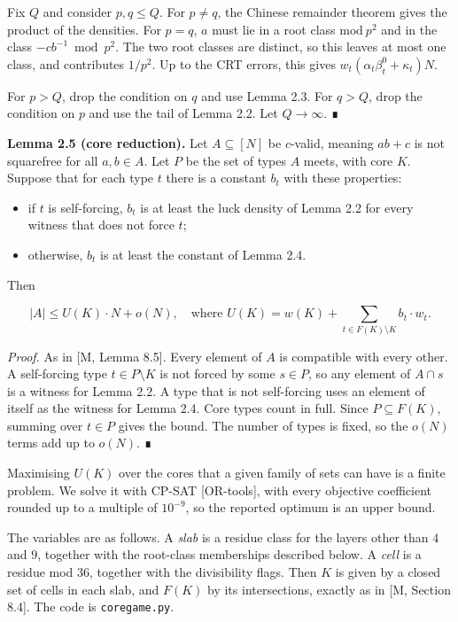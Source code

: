 \documentclass[
  11pt,
]{article}
\providecommand{\tightlist}{%
  \setlength{\itemsep}{0pt}\setlength{\parskip}{0pt}}
\begin{document}
Fix \(Q\) and consider \(p, q \le Q\). For \(p \ne q\), the Chinese
remainder theorem gives the product of the densities. For \(p = q\),
\(a\) must lie in a root class \(\mathrm{mod}\ p^2\) and in the class
\(-cb^{-1} \bmod p^2\). The two root classes are distinct, so this
leaves at most one class, and contributes \(1/p^2\). Up to the CRT
errors, this gives \(w_t(\alpha_t \beta^0_t + \kappa_t)N\).

For \(p > Q\), drop the condition on \(q\) and use Lemma 2.3. For
\(q > Q\), drop the condition on \(p\) and use the tail of Lemma 2.2.
Let \(Q \to \infty\). ∎

\textbf{Lemma 2.5 (core reduction).} Let \(A \subseteq [N]\) be
\(c\)-valid, meaning \(ab + c\) is not squarefree for all
\(a, b \in A\). Let \(P\) be the set of types \(A\) meets, with core
\(K\). Suppose that for each type \(t\) there is a constant \(b_t\) with
these properties:

\begin{itemize}
\tightlist
\item
  if \(t\) is self-forcing, \(b_t\) is at least the luck density of
  Lemma 2.2 for every witness that does not force \(t\);
\item
  otherwise, \(b_t\) is at least the constant of Lemma 2.4.
\end{itemize}

Then

\[|A| \le U(K)\cdot N + o(N), \quad \text{where } U(K) = w(K) + \sum_{t \in F(K) \setminus K} b_t\cdot w_t.\]

\emph{Proof.} As in {[}M, Lemma 8.5{]}. Every element of \(A\) is
compatible with every other. A self-forcing type \(t \in P \setminus K\)
is not forced by some \(s \in P\), so any element of \(A \cap s\) is a
witness for Lemma 2.2. A type that is not self-forcing uses an element
of itself as the witness for Lemma 2.4. Core types count in full. Since
\(P \subseteq F(K)\), summing over \(t \in P\) gives the bound. The
number of types is fixed, so the \(o(N)\) terms add up to \(o(N)\). ∎

Maximising \(U(K)\) over the cores that a given family of sets can have
is a finite problem. We solve it with CP-SAT {[}OR-tools{]}, with every
objective coefficient rounded up to a multiple of \(10^{-9}\), so the
reported optimum is an upper bound.

The variables are as follows. A \emph{slab} is a residue class for the
layers other than \(4\) and \(9\), together with the root-class
memberships described below. A \emph{cell} is a residue mod 36, together
with the divisibility flags. Then \(K\) is given by a closed set of
cells in each slab, and \(F(K)\) by its intersections, exactly as in
{[}M, Section 8.4{]}. The code is \texttt{coregame.py}.
\end{document}

